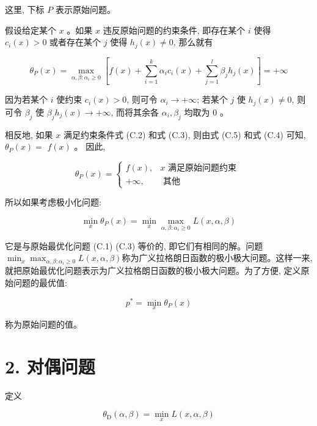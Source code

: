 \documentclass[10pt]{article}
\begin{document}
这里, 下标 $P$ 表示原始问题。

假设给定某个 $x$ 。如果 $x$ 违反原始问题的约束条件, 即存在某个 $i$ 使得 $c_{i}(x)>0$ 或者存在某个 $j$ 使得 $h_{j}(x) \neq 0$, 那么就有


\begin{equation*}
\theta_{P}(x)=\max _{\alpha, \beta: \alpha_{i} \geqslant 0}\left[f(x)+\sum_{i=1}^{k} \alpha_{i} c_{i}(x)+\sum_{j=1}^{l} \beta_{j} h_{j}(x)\right]=+\infty \tag{C.6}
\end{equation*}


因为若某个 $i$ 使约束 $c_{i}(x)>0$, 则可令 $\alpha_{i} \rightarrow+\infty$; 若某个 $j$ 使 $h_{j}(x) \neq 0$, 则可令 $\beta_{j}$ 使 $\beta_{j} h_{j}(x) \rightarrow+\infty$, 而将其余各 $\alpha_{i}, \beta_{j}$ 均取为 0 。

相反地, 如果 $x$ 满足约束条件式 (C.2) 和式 (C.3), 则由式 (C.5) 和式 (C.4) 可知, $\theta_{P}(x)=$ $f(x)$ 。 因此,

\[
\theta_{P}(x)= \begin{cases}f(x), & x \text { 满足原始问题约束 }  \tag{C.7}\\ +\infty, & \text { 其他 }\end{cases}
\]

所以如果考虑极小化问题:


\begin{equation*}
\min _{x} \theta_{P}(x)=\min _{x} \max _{\alpha, \beta: \alpha_{i} \geqslant 0} L(x, \alpha, \beta) \tag{C.8}
\end{equation*}


它是与原始最优化问题 (C.1) (C.3) 等价的, 即它们有相同的解。问题 $\min _{x} \max _{\alpha, \beta: \alpha_{i} \geqslant 0} L(x, \alpha, \beta)$称为广义拉格朗日函数的极小极大问题。这样一来, 就把原始最优化问题表示为广义拉格朗日函数的极小极大问题。为了方便, 定义原始问题的最优值:


\begin{equation*}
p^{*}=\min _{x} \theta_{P}(x) \tag{C.9}
\end{equation*}


称为原始问题的值。

\section*{2. 对偶问题}
定义


\begin{equation*}
\theta_{\mathrm{D}}(\alpha, \beta)=\min _{x} L(x, \alpha, \beta) \tag{C.10}
\end{equation*}
\end{document}
